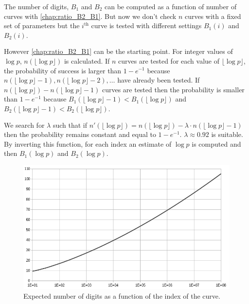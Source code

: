 \documentclass[a4paper, 11pt, pdftex]{report}
\theoremstyle{plain}
\theoremstyle{definition}
\begin{document}
The number of digits, $B_1$ and $B_2$ can be computed as a function of number of curves
with \autoref{chap:ratio_B2_B1}. But now we don't check $n$ curves with a fixed set of
parameters but the $i^\text{th}$ curve is tested with different settings
$B_1(i)$ and $B_2(i)$.

However \autoref{chap:ratio_B2_B1} can be the starting point. For integer values of $\log p$,
$n(\lfloor\log p\rfloor)$ is calculated. If $n$ curves are tested for each value of
$\lfloor\log p\rfloor$, the probability of success is larger than $1 - e^{-1}$ because
$n(\lfloor\log p\rfloor - 1), n(\lfloor\log p\rfloor - 2), \ldots$ have already been tested.
If $n(\lfloor\log p\rfloor) - n(\lfloor\log p\rfloor - 1)$ curves are tested then
the probability is smaller than $1 - e^{-1}$ because
$B_1(\lfloor\log p\rfloor - 1) < B_1(\lfloor\log p\rfloor)$ and
$B_2(\lfloor\log p\rfloor - 1) < B_2(\lfloor\log p\rfloor)$.

We search for $\lambda$ such that if
$n'(\lfloor\log p\rfloor) = n(\lfloor\log p\rfloor) - \lambda \cdot n(\lfloor\log p\rfloor - 1)$
then the probability remains constant and equal to $1 - e^{-1}$. $\lambda \approx 0.92$ is
suitable. By inverting this function, for each index an estimate of $\log p$ is computed and
then $B_1(\log p)$ and $B_2(\log p)$.


\begin{figure}[!ht]
	\vspace*{1.0cm}
	\centering
	\includegraphics[width=15.5cm, angle=0]{img/digits_n.png}
	\caption{\label{fig:dgt_n} Expected number of digits as a function of the index of the curve.}
	\vspace*{1.0cm}
\end{figure}
\end{document}

